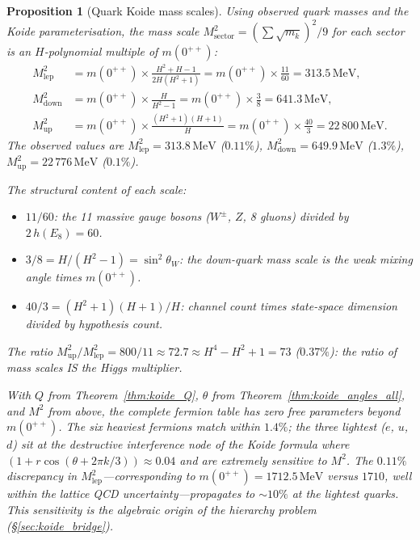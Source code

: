 \documentclass[11pt,a4paper]{article}
\newtheorem{proposition}[theorem]{Proposition}
\theoremstyle{definition}
\theoremstyle{remark}
\begin{document}
\begin{proposition}[Quark Koide mass scales]\label{prop:quark_scales}
Using observed quark masses and the Koide parameterisation, the mass scale $M^2_{\mathrm{sector}}=(\sum\sqrt{m_k})^2/9$ for each sector is an $H$-polynomial multiple of $m(0^{++})$:
\begin{align}
M^2_{\mathrm{lep}} &= m(0^{++})\times\frac{H^2+H-1}{2H(H^2+1)} = m(0^{++})\times\frac{11}{60} = 313.5\,\mathrm{MeV}, \label{eq:M2_lep_confirmed}\\
M^2_{\mathrm{down}} &= m(0^{++})\times\frac{H}{H^2-1} = m(0^{++})\times\frac{3}{8} = 641.3\,\mathrm{MeV}, \label{eq:M2_down}\\
M^2_{\mathrm{up}} &= m(0^{++})\times\frac{(H^2+1)(H+1)}{H} = m(0^{++})\times\frac{40}{3} = 22\,800\,\mathrm{MeV}. \label{eq:M2_up}
\end{align}
The observed values are $M^2_{\mathrm{lep}}=313.8\,\mathrm{MeV}$ ($0.11\%$), $M^2_{\mathrm{down}}=649.9\,\mathrm{MeV}$ ($1.3\%$), $M^2_{\mathrm{up}}=22\,776\,\mathrm{MeV}$ ($0.1\%$).

The structural content of each scale:
\begin{itemize}[nosep]
\item $11/60$: the 11 massive gauge bosons ($W^\pm$, $Z$, 8 gluons) divided by $2\,h(E_8)=60$.
\item $3/8 = H/(H^2-1) = \sin^2\theta_W$: the down-quark mass scale is the weak mixing angle times $m(0^{++})$.
\item $40/3 = (H^2+1)(H+1)/H$: channel count times state-space dimension divided by hypothesis count.
\end{itemize}
The ratio $M^2_{\mathrm{up}}/M^2_{\mathrm{lep}}=800/11\approx 72.7\approx H^4-H^2+1=73$ ($0.37\%$): the ratio of mass scales IS the Higgs multiplier.

With $Q$ from Theorem~\ref{thm:koide_Q}, $\theta$ from Theorem~\ref{thm:koide_angles_all}, and $M^2$ from above, the complete fermion table has zero free parameters beyond $m(0^{++})$. The six heaviest fermions match within $1.4\%$; the three lightest ($e$, $u$, $d$) sit at the destructive interference node of the Koide formula where $(1+r\cos(\theta+2\pi k/3))\approx 0.04$ and are extremely sensitive to $M^2$. The $0.11\%$ discrepancy in $M^2_{\mathrm{lep}}$---corresponding to $m(0^{++})=1712.5\,\mathrm{MeV}$ versus $1710$, well within the lattice QCD uncertainty---propagates to $\sim\!10\%$ at the lightest quarks. This sensitivity is the algebraic origin of the hierarchy problem (\S\ref{sec:koide_bridge}).


\end{proposition}
\end{document}

